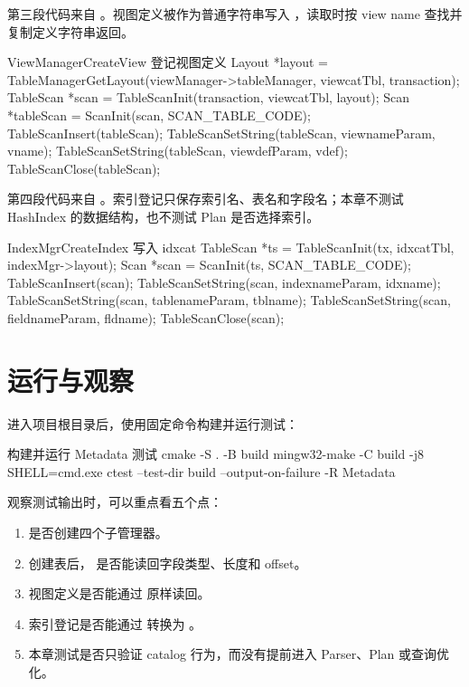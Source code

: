 第三段代码来自 。视图定义被作为普通字符串写入 ，读取时按 view name 查找并复制定义字符串返回。

\begin{dbcode}{ViewManagerCreateView 登记视图定义}
Layout *layout = TableManagerGetLayout(viewManager->tableManager,
                                       viewcatTbl, transaction);
TableScan *scan = TableScanInit(transaction, viewcatTbl, layout);
Scan *tableScan = ScanInit(scan, SCAN_TABLE_CODE);
TableScanInsert(tableScan);
TableScanSetString(tableScan, viewnameParam, vname);
TableScanSetString(tableScan, viewdefParam, vdef);
TableScanClose(tableScan);
\end{dbcode}

第四段代码来自 。索引登记只保存索引名、表名和字段名；本章不测试 HashIndex 的数据结构，也不测试 Plan 是否选择索引。

\begin{dbcode}{IndexMgrCreateIndex 写入 idxcat}
TableScan *ts = TableScanInit(tx, idxcatTbl, indexMgr->layout);
Scan *scan = ScanInit(ts, SCAN_TABLE_CODE);
TableScanInsert(scan);
TableScanSetString(scan, indexnameParam, idxname);
TableScanSetString(scan, tablenameParam, tblname);
TableScanSetString(scan, fieldnameParam, fldname);
TableScanClose(scan);
\end{dbcode}

\section{运行与观察}
\label{sec:metadata-run}

进入项目根目录后，使用固定命令构建并运行测试：

\begin{dbcode}[listing options={language=bash}]{构建并运行 Metadata 测试}
cmake -S . -B build
mingw32-make -C build -j8 SHELL=cmd.exe
ctest --test-dir build --output-on-failure -R Metadata
\end{dbcode}

观察测试输出时，可以重点看五个点：

\begin{enumerate}
  \item {} 是否创建四个子管理器。
  \item 创建表后， 是否能读回字段类型、长度和 offset。
  \item 视图定义是否能通过  原样读回。
  \item 索引登记是否能通过  转换为 。
  \item 本章测试是否只验证 catalog 行为，而没有提前进入 Parser、Plan 或查询优化。
\end{enumerate}

